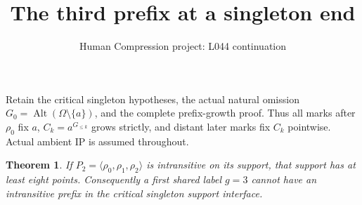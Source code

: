 \documentclass[11pt,a4paper]{article}
\title{The third prefix at a singleton end}
\author{Human Compression project: L044 continuation}
\date{}
\newtheorem{theorem}{Theorem}
\newcommand{\gen}[1]{\langle#1\rangle}
\begin{document}
\maketitle
Retain the critical singleton hypotheses, the actual natural omission
$G_0=\operatorname{Alt}(\Omega\setminus\{a\})$, and the complete
prefix-growth proof. Thus all marks after $\rho_0$ fix $a$,
$C_k=a^{G_{\le k}}$ grows strictly, and distant later marks fix
$C_k$ pointwise. Actual ambient IP is assumed throughout.

\begin{theorem}
If $P_2=\gen{\rho_0,\rho_1,\rho_2}$ is intransitive on its
support, that support has at least eight points.
Consequently a first shared label $g=3$ cannot have an
intransitive prefix in the critical singleton support interface.
\end{theorem}
\end{document}
